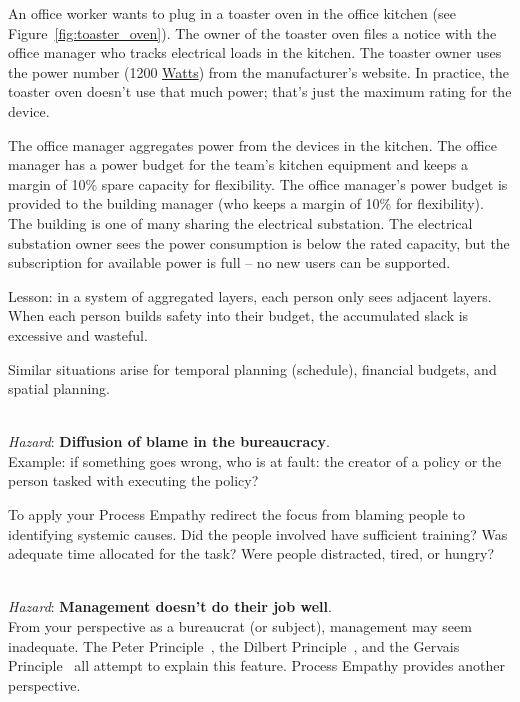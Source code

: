 \begin{mdframed}[frametitle={Layers of Margins},frametitlerule=true,frametitlealignment=\centering]
An office worker wants to plug in a toaster oven in the office kitchen (see Figure~\ref{fig:toaster_oven}). The owner of the toaster oven files a notice with the office manager who tracks electrical loads in the kitchen. 
The toaster owner uses the power number (1200 \href{https://en.wikipedia.org/wiki/Watt}{Watts}) 
%
from the manufacturer's website. In practice, the toaster oven doesn't  use that much power; that's just the maximum rating for the device. 

The office manager aggregates power from the devices in the kitchen. The office manager has a power budget for the team's kitchen equipment and keeps a margin of 10\% spare capacity for flexibility. The office manager's power budget is provided to the building manager (who keeps a margin of 10\% for flexibility). The building is one of many sharing the electrical substation. The electrical substation owner sees the power consumption is below the rated capacity, but the subscription for available power is full -- no new users can be supported.
\end{mdframed}
Lesson: in a system of aggregated layers, each person only sees adjacent layers. When each person builds safety into their budget, the accumulated slack is excessive and wasteful.

Similar situations arise for temporal planning (schedule), financial budgets, and spatial planning. 


\ \\
\textit{Hazard}: \textbf{Diffusion of blame in the bureaucracy}. \\
Example: if something goes wrong, who is at fault: the creator of a policy or the person tasked with executing the policy?

To apply your Process Empathy redirect the focus from blaming people to identifying systemic causes. Did the people involved have sufficient training? Was adequate time allocated for the task? Were people distracted, tired, or hungry? 

\ \\
\textit{Hazard}: \textbf{Management doesn't do their job well}. \\
From your perspective as a bureaucrat (or subject), management may seem inadequate. The Peter Principle~\cite{1970_Peter}, the Dilbert Principle~\cite{1997_Adams}, and the Gervais Principle~\cite{2009_Rao} all attempt to explain this feature. Process Empathy provides another perspective. 


